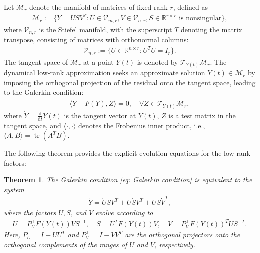 \documentclass[preprint,11pt]{elsarticle}
\newtheorem{theorem}{Theorem}[section]
\begin{document}
Let $\mathcal{M}_r$ denote the manifold of matrices of fixed rank $r$, defined as 
\begin{align*}
    \mathcal{M}_r := \{Y = USV^T : U \in \mathcal{V}_{m,r}, V \in \mathcal{V}_{n,r}, S \in \mathbb{R}^{r \times r} \text{ is nonsingular}\}, 
\end{align*}
where $\mathcal{V}_{n,r}$ is the Stiefel manifold, with the superscript $T$ denoting the matrix transpose, consisting of matrices with orthonormal columns: 
\begin{align}
    \mathcal{V}_{n,r} := \{U \in \mathbb{R}^{n \times r} : U^T U = I_r\}. 
\end{align}
The tangent space of $\mathcal{M}_r$ at a point $Y(t)$ is denoted by $\mathcal{T}_{Y(t)}\mathcal{M}_r$. The dynamical low-rank approximation seeks an approximate solution $Y(t) \in \mathcal{M}_r$ by imposing the orthogonal projection of the residual onto the tangent space, leading to the Galerkin condition: 
\begin{align}\label{eq: Galerkin condition}
    \langle \dot{Y}-F(Y), Z \rangle = 0, \quad \forall Z \in \mathcal{T}_{Y(t)}\mathcal{M}_r, 
\end{align}
where $\dot{Y}=\frac{\mathrm{d}}{\mathrm{d}t}Y(t)$ is the tangent vector at $Y(t)$, $Z$ is a test matrix in the tangent space, and $\langle \cdot, \cdot \rangle$ denotes the Frobenius inner product, i.e., $\langle A, B \rangle = \operatorname{tr}(A^T B)$.

The following theorem provides the explicit evolution equations for the low-rank factors: 
\begin{theorem}
    The Galerkin condition \cref{eq: Galerkin condition} is equivalent to the system
    \begin{align}\label{eq: dynamical low-rank approximation}
        \dot{Y} = \dot{U} S V^T + U \dot{S} V^T + U S \dot{V}^T, 
    \end{align}
    where the factors $U, S$, and $V$ evolve according to 
    \begin{align}\label{eq: dynamical low-rank approximation 2}
        \dot{U} = P_{U}^{\perp} F(Y(t)) V S^{-1}, \quad \dot{S} = U^T F(Y(t)) V, \quad \dot{V} = P_{V}^{\perp} F(Y(t))^T U S^{-T}. 
    \end{align}
    Here, $P_{U}^{\perp} = I - UU^T$ and $P_{V}^{\perp} = I - VV^T$ are the orthogonal projectors onto the orthogonal complements of the ranges of $U$ and $V$, respectively.
\end{theorem}
\end{document}
